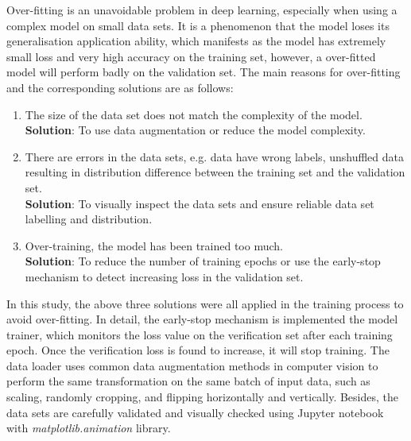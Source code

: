Over-fitting is an unavoidable problem in deep learning, especially when using a complex model on small data sets.
It is a phenomenon that the model loses its generalisation application ability, which manifests as the model has extremely small loss and very high accuracy on the training set, however, a over-fitted model will perform badly on the validation set. 
The main reasons for over-fitting and the corresponding solutions are as follows:
\begin{enumerate}
    \item The size of the data set does not match the complexity of the model. \\ \textbf{Solution}: To use data augmentation or reduce the model complexity.
    \item There are errors in the data sets, e.g. data have wrong labels, unshuffled data resulting in distribution difference between the training set and the validation set. \\
    \textbf{Solution}: To visually inspect the data sets and ensure reliable data set labelling and distribution.
    \item Over-training, the model has been trained too much. \\
    \textbf{Solution}: To reduce the number of training epochs or use the early-stop mechanism to detect increasing loss in the validation set.
\end{enumerate}

In this study, the above three solutions were all applied in the training process to avoid over-fitting.
In detail, the early-stop mechanism is implemented the model trainer, which monitors the loss value on the verification set after each training epoch.
Once the verification loss is found to increase, it will stop training.
The data loader uses common data augmentation methods in computer vision to perform the same transformation on the same batch of input data, such as scaling, randomly cropping, and flipping horizontally and vertically.
Besides, the data sets are carefully validated and visually checked using Jupyter notebook with \textit{matplotlib.animation} library.

